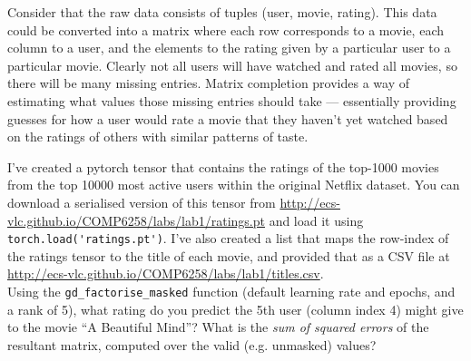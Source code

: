 \documentclass[a4paper]{article}
\begin{document}
Consider that the raw data consists of tuples (user, movie, rating). This data could be converted into a matrix where each row corresponds to a movie, each column to a user, and the elements to the rating given by a particular user to a particular movie. Clearly not all users will have watched and rated all movies, so there will be many missing entries. Matrix completion provides a way of estimating what values those missing entries should take --- essentially providing guesses for how a user would rate a movie that they haven't yet watched based on the ratings of others with similar patterns of taste.
\\
\begin{tcolorbox}[title=4.1 Predict a movie rating (1 mark)]

I've created a pytorch tensor that contains the ratings of the top-1000 movies from the top 10000 most active users within the original Netflix dataset. You can download a serialised version of this tensor from \url{http://ecs-vlc.github.io/COMP6258/labs/lab1/ratings.pt} and load it using \verb|torch.load('ratings.pt')|. I've also created a list that maps the row-index of the ratings tensor to the title of each movie, and provided that as a CSV file at \url{http://ecs-vlc.github.io/COMP6258/labs/lab1/titles.csv}. 
\\[1em]
Using the \verb|gd_factorise_masked| function (default learning rate and epochs, and a rank of 5), what rating do you predict the 5th user (column index 4) might give to the movie ``A Beautiful Mind''? What is the \emph{sum of squared errors} of the resultant matrix, computed over the valid (e.g. unmasked) values?

\end{tcolorbox}
\end{document}
